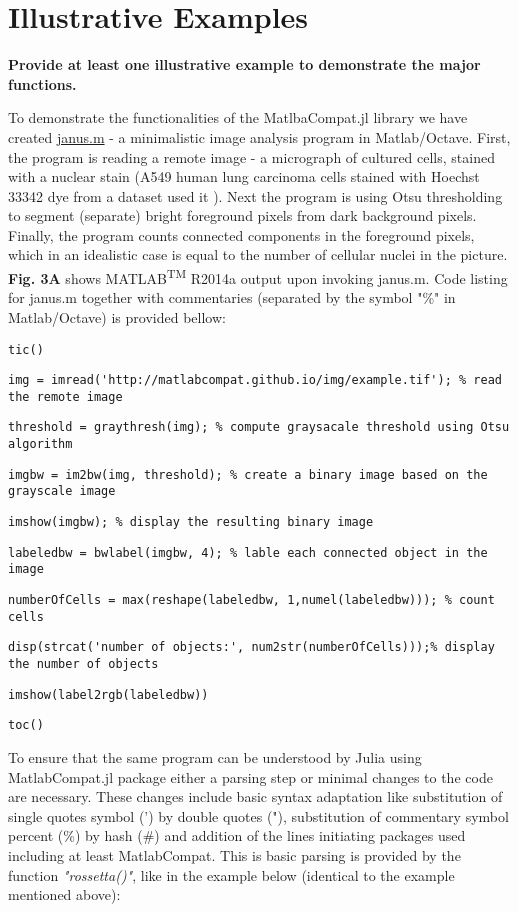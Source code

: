 \section{Illustrative Examples}
\label{} 

\textbf{Provide at least one illustrative example to demonstrate the major functions.}

To demonstrate the functionalities of the MatlbaCompat.jl library we have created \href{https://github.com/MatlabCompat/MatlabCompat.jl/blob/dev/test/janus.m}{janus.m} - a minimalistic image analysis program in Matlab/Octave. First, the program is reading a remote image - a micrograph of cultured cells, stained with a nuclear stain (A549 human lung carcinoma cells stained with Hoechst 33342 dye from a dataset used it \cite{22787215}). Next the program is using Otsu \cite{otsu1975threshold} thresholding to segment (separate) bright foreground pixels from dark background pixels. Finally, the program counts connected components in the foreground pixels, which in an idealistic case is equal to the number of cellular nuclei in the picture. \textbf{Fig. 3A} shows MATLAB\textsuperscript{TM} R2014a output upon invoking janus.m. Code listing for janus.m together with commentaries (separated by the symbol "\%" in Matlab/Octave) is provided bellow:

\verb|tic()|

\verb|img = imread('http://matlabcompat.github.io/img/example.tif'); % read the remote image|

\verb|threshold = graythresh(img); % compute graysacale threshold using Otsu algorithm|

\verb|imgbw = im2bw(img, threshold); % create a binary image based on the grayscale image|

\verb|imshow(imgbw); % display the resulting binary image|

\verb|labeledbw = bwlabel(imgbw, 4); % lable each connected object in the image|

\verb|numberOfCells = max(reshape(labeledbw, 1,numel(labeledbw))); % count cells|

\verb|disp(strcat('number of objects:', num2str(numberOfCells)));% display the number of objects|

\verb|imshow(label2rgb(labeledbw))|

\verb|toc()|

To ensure that the same program can be understood by Julia using MatlabCompat.jl package either a parsing step or minimal changes to the code are necessary. These changes include basic syntax adaptation like substitution of single quotes symbol (') by double quotes ("), substitution of commentary symbol percent (\%) by hash (#) and addition of the lines initiating packages used including at least MatlabCompat. This is basic parsing is provided by the function \textit{"rossetta()"}, like in the example below (identical to the example mentioned above):

